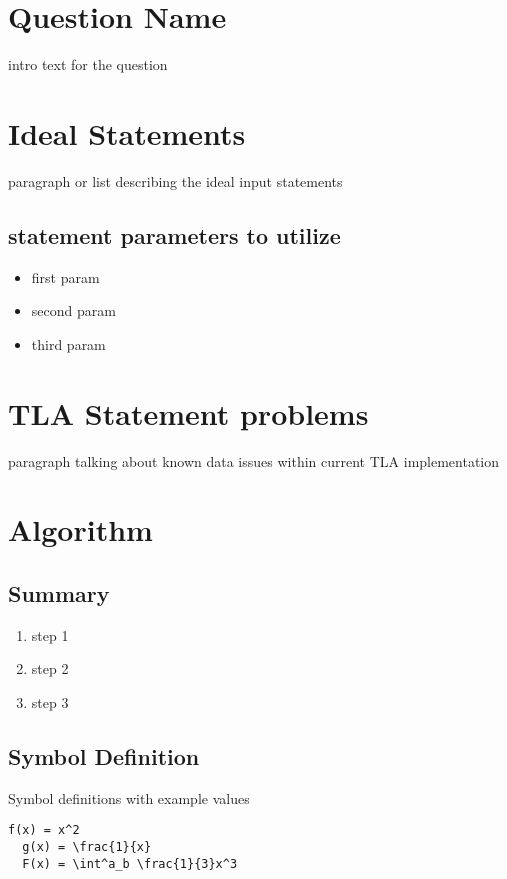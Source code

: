 \documentclass{article}
\begin{document}
\section*{Question Name}
intro text for the question

\section{Ideal Statements}
paragraph or list describing the ideal input statements

\subsection{statement parameters to utilize}

\begin{itemize}
  \item first param
  \item second param
  \item third param
  \end{itemize}

\section{TLA Statement problems}
paragraph talking about known data issues within current TLA implementation

\section{Algorithm}

\subsection{Summary}
\begin{enumerate}
  \item step 1
  \item step 2
  \item step 3
  \end{enumerate}

  \subsection{Symbol Definition}
  Symbol definitions with example values
  \begin{lstlisting}[frame=single]
  f(x) = x^2
  g(x) = \frac{1}{x}
  F(x) = \int^a_b \frac{1}{3}x^3
\end{lstlisting}
\end{document}
